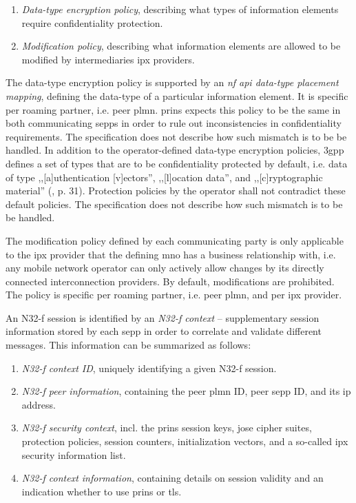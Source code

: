 \begin{enumerate}[label=--]
    \item \textit{Data-type encryption policy}, describing what types of information elements require confidentiality protection.
    \item \textit{Modification policy}, describing what information elements are allowed to be modified by intermediaries \gls{ipx} providers.
\end{enumerate}

The data-type encryption policy is supported by an \textit{\gls{nf} \gls{api} data-type placement mapping}, defining the data-type of a particular information element.
It is specific per roaming partner, i.e. peer \gls{plmn}.
\gls{prins} expects this policy to be the same in both communicating \glspl{sepp} in order to rule out inconsistencies in confidentiality requirements.
The specification does not describe how such mismatch is to be be handled.
In addition to the operator-defined data-type encryption policies, \gls{3gpp} defines a set of types that are to be confidentiality protected by default, i.e. data of type ,,[a]uthentication [v]ectors'', ,,[l]ocation data'', and ,,[c]ryptographic material'' (\cite{3gpp.33.501}, p. 31).
Protection policies by the operator shall not contradict these default policies.
The specification does not describe how such mismatch is to be be handled.

The modification policy defined by each communicating party is only applicable to the \gls{ipx} provider that the defining \gls{mno} has a business relationship with, i.e. any mobile network operator can only actively allow changes by its directly connected interconnection providers.
By default, modifications are prohibited.
The policy is specific per roaming partner, i.e. peer \gls{plmn}, and per \gls{ipx} provider.

An N32-f session is identified by an \textit{N32-f context} -- supplementary session information stored by each \gls{sepp} in order to correlate and validate different messages.
This information can be summarized as follows:

\begin{enumerate}[label=--]
    \item \textit{N32-f context ID}, uniquely identifying a given N32-f session.
    \item \textit{N32-f peer information}, containing the peer \gls{plmn} ID, peer \gls{sepp} ID, and its \gls{ip} address.
    \item \textit{N32-f security context}, incl. the \gls{prins} session keys, \gls{jose} cipher suites, protection policies, session counters, initialization vectors, and a so-called \gls{ipx} security information list.
    \item \textit{N32-f context information}, containing details on session validity and an indication whether to use \gls{prins} or \gls{tls}.
\end{enumerate}

